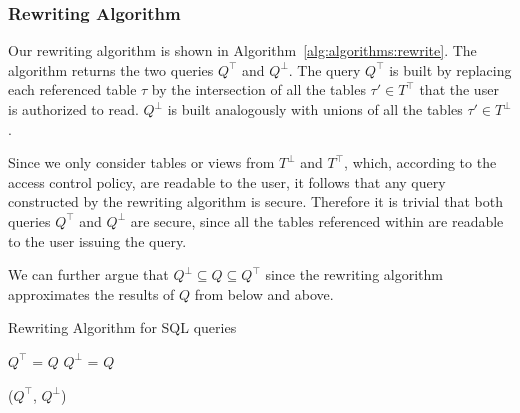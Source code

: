 \subsubsection{Rewriting Algorithm}
%
Our rewriting algorithm is shown in Algorithm~\ref{alg:algorithms:rewrite}.
%
The algorithm returns the two queries $Q^\top$ and $Q^\bot$.
%
The query $Q^\top$ is built by replacing each referenced table $\tau$ by the intersection of all the tables $\tau' \in T^\top$ that the user is authorized to read.
%
$Q^\bot$ is built analogously with unions of all the tables $\tau' \in T^\bot$.

Since we only consider tables or views from $T^\bot$ and $T^\top$, which, according to the access control policy, are readable to the user, it follows that any query constructed by the rewriting algorithm is secure.
%
Therefore it is trivial that both queries $Q^\top$ and $Q^\bot$ are secure, since all the tables referenced within are readable to the user issuing the query.

We can further argue that $Q^\bot \subseteq Q \subseteq Q^\top$ since the rewriting algorithm approximates the results of $Q$ from below and above. 
%
\begin{algorithm}
\caption{Rewriting Algorithm for SQL queries}
\label{alg:algorithms:rewrite}
	\SetAlgoLined
	$Q^\top$ = $Q$\;
	$Q^\bot$ = $Q$\;

     \Return ($Q^\top$, $Q^\bot$)\;

\end{algorithm}

